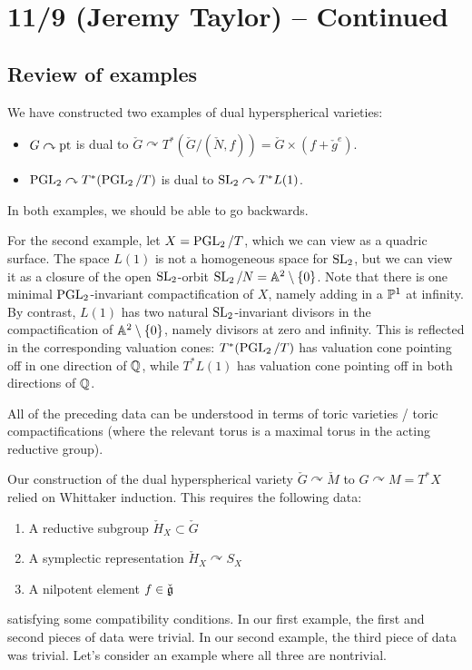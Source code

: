 \documentclass{article}
\begin{document}
\section{11/9 (Jeremy Taylor) -- Continued}

\subsection{Review of examples}

We have constructed two examples of dual hyperspherical varieties:
\begin{itemize}
	\item $G \curvearrowright \pt$ is dual to $\check{G} \curvearrowright T^*(\check{G} / (\check{N},f)) = \check{G} \times (f + \check{g}^e)$.
	\item $\PGL_2 \curvearrowright T^*(\PGL_2 / T)$ is dual to $\SL_2 \curvearrowright T^* L(1)$.
\end{itemize}
In both examples, we should be able to go backwards.

For the second example, let $X = \PGL_2 / T$, which we can view as a quadric surface.
The space $L(1)$ is not a homogeneous space for $\SL_2$, but we can view it as a closure of the open $\SL_2$-orbit $\SL_2 / N = \AA^2 \setminus \{0\}$.
Note that there is one minimal $\PGL_2$-invariant compactification of $X$, namely adding in a $\PP^1$ at infinity.
By contrast, $L(1)$ has two natural $\SL_2$-invariant divisors in the compactification of $\AA^2 \setminus \{0\}$, namely divisors at zero and infinity.
This is reflected in the corresponding valuation cones: $T^*(\PGL_2 / T)$ has valuation cone pointing off in one direction of $\QQ$, while $T^* L(1)$ has valuation cone pointing off in both directions of $\QQ$.

All of the preceding data can be understood in terms of toric varieties / toric compactifications (where the relevant torus is a maximal torus in the acting reductive group).


Our construction of the dual hyperspherical variety $\check{G} \curvearrowright \check{M}$ to $G \curvearrowright M = T^*X$ relied on Whittaker induction.
This requires the following data:
\begin{enumerate}
	\item A reductive subgroup $\check{H}_X \subset \check{G}$
	\item A symplectic representation $\check{H}_X \curvearrowright S_X$
	\item A nilpotent element $f \in \check{\gf}$
\end{enumerate}
satisfying some compatibility conditions.
In our first example, the first and second pieces of data were trivial.
In our second example, the third piece of data was trivial.
Let's consider an example where all three are nontrivial.
\end{document}
